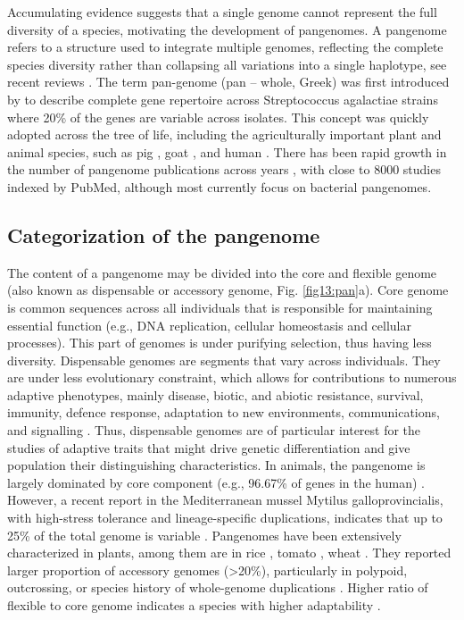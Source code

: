 \documentclass[../main.tex]{subfiles}
\begin{document}
Accumulating evidence suggests that a single genome cannot represent  the full diversity of a species, motivating the development of  pangenomes. A pangenome refers to a structure used to  integrate multiple genomes, reflecting the complete species diversity rather than collapsing all variations into a single haplotype, see recent reviews \citep{bayer2020plant,golicz2016pangenome,sherman2020pan,della2021pan}. The term pan-genome (pan – whole, Greek) was first introduced by \citet{tettelin2005genome} to describe complete gene repertoire across Streptococcus agalactiae strains where 20\% of the genes are variable across isolates. This concept was quickly adopted across the tree of life, including the agriculturally important plant and animal species, such as pig \citep{li2017comprehensive,tian2019building}, goat \citep{li2019towards}, and human \citep{duan2019hupan,sherman2019assembly}. There has been rapid growth in the number of pangenome publications across years \citep{bayer2020plant}, with close to 8000 studies indexed by PubMed,  although most currently focus on bacterial pangenomes.  

\subsection{Categorization of the pangenome}

The content of a pangenome may be divided into the core and flexible genome (also known  as dispensable or accessory genome, Fig. \ref{fig13:pan}a). Core genome is common sequences across all individuals that is responsible for maintaining essential function (e.g., DNA replication, cellular homeostasis and cellular processes). This part of genomes is under purifying selection, thus having less diversity. Dispensable genomes are segments that vary across individuals. They are under less evolutionary constraint, which allows for contributions to numerous adaptive phenotypes, mainly disease, biotic, and abiotic resistance, survival, immunity, defence response, adaptation to new environments, communications, and signalling \citep{golicz2020pangenomics}. Thus, dispensable genomes are of particular interest for the studies of adaptive traits that might drive genetic differentiation and give population their distinguishing characteristics. In animals, the pangenome is largely dominated by core component (e.g., 96.67\% of genes in the human) \citep{duan2019hupan}. However, a recent report in the Mediterranean mussel Mytilus galloprovincialis, with high-stress tolerance and lineage-specific duplications, indicates that up to 25\% of the total genome is variable \citep{gerdol2020massive}. Pangenomes have been extensively characterized in plants, among them are in rice \citep{zhao2018pan}, tomato \citep{gao2019tomato}, wheat \citep{walkowiak2020multiple}. They reported larger proportion of accessory genomes (>20\%), particularly in polypoid, outcrossing, or species history of whole-genome duplications \citep{tao2019exploring}. Higher ratio of flexible to core genome indicates a species with higher adaptability \citep{tranchant2018plant}. 
\end{document}
